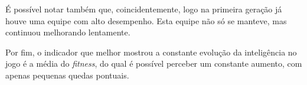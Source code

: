 \documentclass[
	12pt,					%
	openright,				%
	oneside,				%
	a4paper,				%
	bibjustif,				%
	chapter=TITLE,			%
	english,				%
	brazil,					%
	]{abntex2}
\begin{document}
	É possível notar também que, coincidentemente,
	logo na primeira geração já houve uma equipe com alto desempenho.
	Esta equipe não só se manteve,
	 mas continuou melhorando lentamente.
	
	Por fim, o indicador que melhor mostrou a constante evolução da inteligência no jogo é a média do \textit{fitness},
	do qual é possível perceber um constante aumento,
	com apenas pequenas quedas pontuais.
	
	\postextual
	
\end{document}
